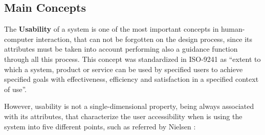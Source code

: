 \subsection{Main Concepts}
\label{subsec:main_concepts}
The \textbf{Usability} of a system is one of the most important concepts in human-computer interaction, that can not be forgotten on the design process, since its attributes must be taken into account performing also a guidance function through all this process. This concept was standardized in ISO-9241 \cite{iso9241-11_2018} as “extent to which a system, product or service can be used by specified users to achieve specified goals with effectiveness, efficiency and satisfaction in a specified context of use”.

However, usability is not a single-dimensional property, being always associated with its attributes, that characterize the user accessibility when is using the system into five different points, such as referred by Nielsen \cite{usabilityEngineering}:


